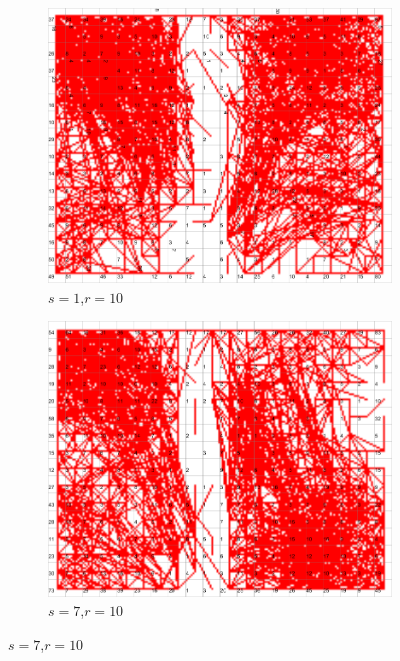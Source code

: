 \documentclass{acm_proc_article-sp}
\begin{document}
\begin{figure}
\centering
    \centering
    \begin{subfigure}[b]{0.30\linewidth}
        \includegraphics[width=\linewidth]{img/wine-newmid-radius-neighbourhood-graph--r-10-seed-1}
        \caption{$s=1$,$r=10$}
    \end{subfigure}
    \begin{subfigure}[b]{0.30\linewidth}
        \includegraphics[width=\linewidth]{img/wine-newmid-radius-neighbourhood-graph--r-10-seed-7}
        \caption{$s=7$,$r=10$}
    \end{subfigure}

\end{figure}
\end{document}
